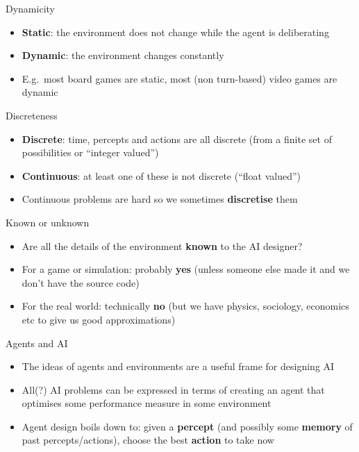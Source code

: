 \begin{frame}{Dynamicity}
    \begin{itemize}
        \pause\item \textbf{Static}: the environment does not change while the agent is deliberating
        \pause\item \textbf{Dynamic}: the environment changes constantly
        \pause\item E.g.\ most board games are static, most (non turn-based) video games are dynamic
    \end{itemize}
\end{frame}

\begin{frame}{Discreteness}
    \begin{itemize}
        \pause\item \textbf{Discrete}: time, percepts and actions are all discrete
            (from a finite set of possibilities or ``integer valued'')
        \pause\item \textbf{Continuous}: at least one of these is not discrete
            (``float valued'')
        \pause\item Continuous problems are hard so we sometimes \textbf{discretise} them
    \end{itemize}
\end{frame}

\begin{frame}{Known or unknown}
    \begin{itemize}
        \pause\item Are all the details of the environment \textbf{known} to the AI designer?
        \pause\item For a game or simulation: probably \textbf{yes}
            (unless someone else made it and we don't have the source code)
        \pause\item For the real world: technically \textbf{no}
            (but we have physics, sociology, economics etc to give us good approximations)
    \end{itemize}
\end{frame}

\begin{frame}{Agents and AI}
    \begin{itemize}
        \pause\item The ideas of agents and environments are a useful frame for designing AI
        \pause\item All(?) AI problems can be expressed in terms of creating an agent
            that optimises some performance measure in some environment
        \pause\item Agent design boils down to: given a \textbf{percept} (and possibly some \textbf{memory} of past percepts/actions),
            choose the best \textbf{action} to take now
    \end{itemize}
\end{frame}
